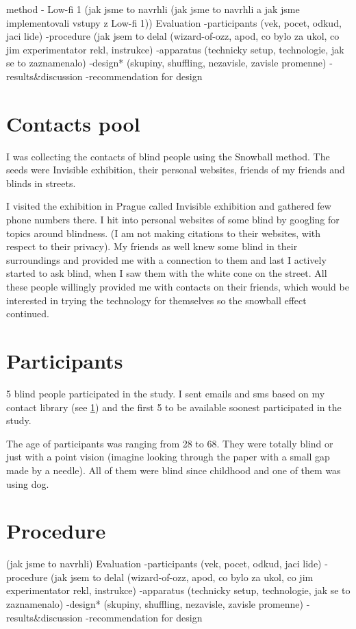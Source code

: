 \documentclass[11pt,twoside,a4paper]{book}
\begin{document}
	method - Low-fi 1
	(jak jsme to navrhli (jak jsme to navrhli a jak jsme implementovali vstupy z Low-fi 1))
	Evaluation
	-participants (vek, pocet, odkud, jaci lide)
	-procedure (jak jsem to delal (wizard-of-ozz, apod, co bylo za ukol, co jim experimentator rekl, instrukce)
	-apparatus (technicky setup, technologie, jak se to zaznamenalo)
	-design* (skupiny, shuffling, nezavisle, zavisle promenne)
	-results\&discussion
	-recommendation for design
	
	\section{Contacts pool} \label{sec:contactsPool}
	I was collecting the contacts of blind people using the Snowball method. The seeds were Invisible exhibition, their personal websites, friends of my friends and blinds in streets.
	
	I visited the exhibition in Prague called Invisible exhibition \cite{later} and gathered few phone numbers there. I hit into personal websites of some blind by googling for topics around blindness. (I am not making citations to their websites, with respect to their privacy). My friends as well knew some blind in their surroundings and provided me with a connection to them and last I actively started to ask blind, when I saw them with the white cone on the street. All these people willingly provided me with contacts on their friends, which would be interested in trying the technology for themselves so the snowball effect continued.
	\section{Participants}
	
	5 blind people participated in the study. I sent emails and sms based on my contact library (see \ref{sec:contactsPool}) and the first 5 to be available soonest participated in the study. 
	
	The age of participants was ranging from 28 to 68.
	They were totally blind or just with a point vision (imagine looking through the paper with a small gap made by a needle).
	All of them were blind since childhood and one of them was using dog.
	\section{Procedure}
	(jak jsme to navrhli)
	Evaluation
	-participants (vek, pocet, odkud, jaci lide)
	-procedure (jak jsem to delal (wizard-of-ozz, apod, co bylo za ukol, co jim experimentator rekl, instrukce)
	-apparatus (technicky setup, technologie, jak se to zaznamenalo)
	-design* (skupiny, shuffling, nezavisle, zavisle promenne)
	-results\&discussion
	-recommendation for design
	
\end{document}
